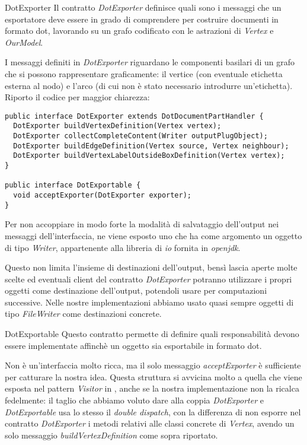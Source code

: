 \begin{paragraph}{DotExporter}
  Il contratto \emph{DotExporter} definisce quali sono i messaggi che
  un esportatore deve essere in grado di comprendere per costruire
  documenti in formato dot, lavorando su un grafo codificato con le
  astrazioni di \emph{Vertex} e \emph{OurModel}.

  I messaggi definiti in \emph{DotExporter} riguardano le componenti
  basilari di un grafo che si possono rappresentare graficamente: il
  vertice (con eventuale etichetta esterna al nodo) e l'arco (di cui
  non \`e stato necessario introdurre un'etichetta). Riporto il codice
  per maggior chiarezza:
  \begin{lstlisting}
public interface DotExporter extends DotDocumentPartHandler {
  DotExporter buildVertexDefinition(Vertex vertex);
  DotExporter collectCompleteContent(Writer outputPlugObject);
  DotExporter buildEdgeDefinition(Vertex source, Vertex neighbour);
  DotExporter buildVertexLabelOutsideBoxDefinition(Vertex vertex);
}

public interface DotExportable {
  void acceptExporter(DotExporter exporter);
}

  \end{lstlisting}
  Per non accoppiare in modo forte la modalit\`a di salvataggio
  dell'output nei messaggi dell'interfaccia, ne viene esposto uno che
  ha come argomento un oggetto di tipo \emph{Writer}, appartenente alla
  libreria di \emph{io} fornita in \emph{openjdk}.

  Questo non limita l'insieme di destinazioni dell'output, bens\`i
  lascia aperte molte scelte ed eventuali client del contratto
  \emph{DotExporter} potranno utilizzare i propri oggetti come
  destinazione dell'output, potendoli usare per computazioni
  successive. Nelle nostre implementazioni abbiamo usato quasi sempre
  oggetti di tipo \emph{FileWriter} come destinazioni concrete.
\end{paragraph}

\begin{paragraph}{DotExportable}
  Questo contratto permette di definire quali responsabilit\`a devono
  essere implementate affinch\`e un oggetto sia esportabile in formato
  dot.

  Non \`e un'interfaccia molto ricca, ma il solo messaggio
  \emph{acceptExporter} \`e sufficiente per catturare la nostra
  idea. Questa struttura si avvicina molto a quella che viene esposta
  nel pattern \emph{Visitor} in \cite{SmalltalkCompanion98}, anche se
  la nostra implementazione non la ricalca fedelmente: il taglio che
  abbiamo voluto dare alla coppia \emph{DotExporter} e
  \emph{DotExportable} usa lo stesso il \emph{double dispatch}, con la
  differenza di non esporre nel contratto \emph{DotExporter} i metodi
  relativi alle classi concrete di \emph{Vertex}, avendo un solo
  messaggio \emph{buildVertexDefinition} come sopra riportato.
\end{paragraph}




